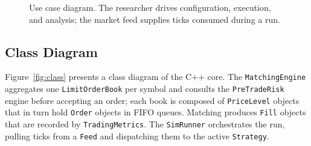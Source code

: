 \documentclass[12pt,oneside,a4paper]{report}
\begin{document}
\begin{figure}[H]
\caption[Use case diagram]{Use case diagram. The researcher drives configuration, execution, and analysis; the market feed supplies ticks consumed during a run.}
\label{fig:usecase}
\end{figure}

\subsection{Class Diagram}

Figure~\ref{fig:class} presents a class diagram of the C++ core. The \texttt{MatchingEngine} aggregates one \texttt{LimitOrderBook} per symbol and consults the \texttt{PreTradeRisk} engine before accepting an order; each book is composed of \texttt{PriceLevel} objects that in turn hold \texttt{Order} objects in FIFO queues. Matching produces \texttt{Fill} objects that are recorded by \texttt{TradingMetrics}. The \texttt{SimRunner} orchestrates the run, pulling ticks from a \texttt{Feed} and dispatching them to the active \texttt{Strategy}.
\end{document}
